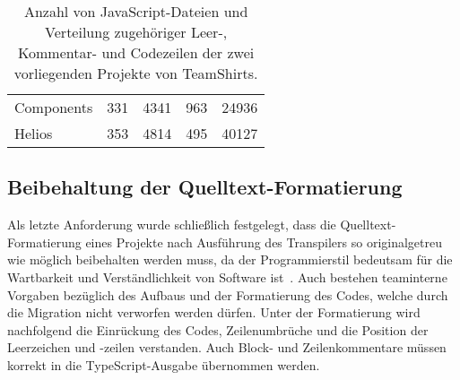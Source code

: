 
\bigbreak
\begin{table}[tbh]
  \footnotesize
  \begin{tabu} to 
    \midrule
     &  &  &  &   \\
    \midrule
    Components & 331 & 4341 & 963 & 24936 \\
    Helios & 353 & 4814 & 495 & 40127 \\
    \midrule
  \end{tabu}
  \caption{Anzahl von JavaScript-Dateien und Verteilung zugehöriger Leer-, Kommentar- und Codezeilen der zwei vorliegenden Projekte von TeamShirts.}
  \label{tab:projects-loc}
\end{table}


\subsection{Beibehaltung der Quelltext-Formatierung}
\label{subsec:requirement:format}

Als letzte Anforderung wurde schließlich festgelegt, dass die Quelltext-Formatierung eines Projekte nach Ausführung des Transpilers so originalgetreu wie möglich beibehalten werden muss, da der Programmierstil bedeutsam für die Wartbarkeit und Verständlichkeit von Software ist~\autocite[146]{KERNIGHAN:1982}. Auch bestehen teaminterne Vorgaben bezüglich des Aufbaus und der Formatierung des Codes, welche durch die Migration nicht verworfen werden dürfen. Unter der Formatierung wird nachfolgend die Einrückung des Codes, Zeilenumbrüche und die Position der Leerzeichen und -zeilen verstanden. Auch Block- und Zeilenkommentare müssen korrekt in die TypeScript-Ausgabe übernommen werden.
